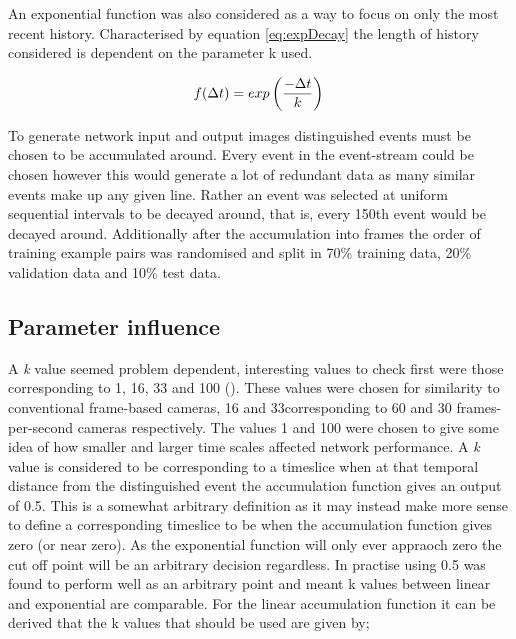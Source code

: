 An exponential function was also considered as a way to focus on only the most recent history.
Characterised by equation \ref{eq:expDecay} the length of history considered is dependent on the parameter k used. 

\begin{equation}
 \label{eq:expDecay}
    f(\Delta t) = exp\left(\frac{-\Delta t}{k}\right) \\
\end{equation}


To generate network input and output images distinguished events must be chosen to be accumulated around.
Every event in the event-stream could be chosen however this would generate a lot of redundant data as many similar events make up any given line.
Rather an event was selected at uniform sequential intervals to be decayed around, that is, every 150th event would be decayed around. 
Additionally after the accumulation into frames the order of training example pairs was randomised and split in 70\% training data, 20\% validation data and 10\% test data. 


\subsection{Parameter influence}
A \textit{k} value seemed problem dependent, interesting values to check first were those corresponding to 1, 16, 33 and 100 (\ms). These values were chosen for similarity to conventional frame-based cameras, 16 and 33\ms corresponding to 60 and 30 frames-per-second cameras respectively. 
The values 1 and 100 \ms were chosen to give some idea of how smaller and larger time scales affected network performance. 
A \textit{k} value is considered to be corresponding to a timeslice when at that temporal distance from the distinguished event the accumulation function gives an output of 0.5.
This is a somewhat arbitrary definition as it may instead make more sense to define a corresponding timeslice to be when the accumulation function gives zero (or near zero). 
As the exponential function will only ever appraoch zero the cut off point will be an arbitrary decision regardless.
In practise using 0.5 was found to perform well as an arbitrary point and meant k values between linear and exponential are comparable.
For the linear accumulation function it can be derived that the k values that should be used are given by;

